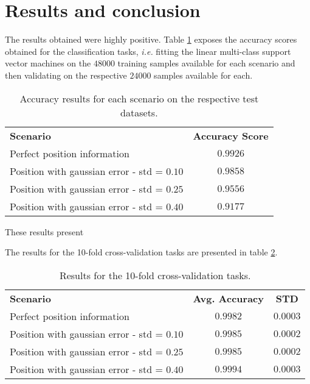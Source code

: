 \documentclass{kthreport}
\theoremstyle{definition}
\begin{document}
\section{Results and conclusion}

The results obtained were highly positive.
Table \ref{tbl:accuracy} exposes the accuracy scores obtained for the classification tasks, \emph{i.e.} fitting the linear multi-class support vector machines on the $48 000$ training samples available for each scenario and then validating on the respective $24 000$ samples available for each.

\begin{table}[tb]
	\centering
	\begin{tabular}{|l|c|}
		\hline 
		\textbf{Scenario} & \textbf{Accuracy Score} \\ 
		Perfect position information & $0.9926$ \\ 
		Position with gaussian error - std = $0.10$ & $0.9858$ \\ 
		Position with gaussian error - std = $0.25$ & $0.9556$ \\ 
		Position with gaussian error - std = $0.40$ & $0.9177$ \\ 
		\hline 
	\end{tabular}
	\caption{Accuracy results for each scenario on the respective test datasets.}
    \label{tbl:accuracy}
\end{table}

These results present 

The results for the 10-fold cross-validation tasks are presented in table \ref{tbl:10foldcv}.

\begin{table}
    \centering
    \begin{tabular}{|l|c|c|}
        \hline 
        \textbf{Scenario} & \textbf{Avg. Accuracy} & \textbf{STD} \\ 
        Perfect position information & $0.9982$ & $0.0003$ \\ 
        Position with gaussian error - std = $0.10$ & $0.9985$ & $0.0002$ \\ 
        Position with gaussian error - std = $0.25$ & $0.9985$ & $0.0002$ \\ 
        Position with gaussian error - std = $0.40$ & $0.9994$ & $0.0003$ \\ 
        \hline 
    \end{tabular}
    \caption{Results for the 10-fold cross-validation tasks.}
    \label{tbl:10foldcv}
\end{table}
\end{document}
